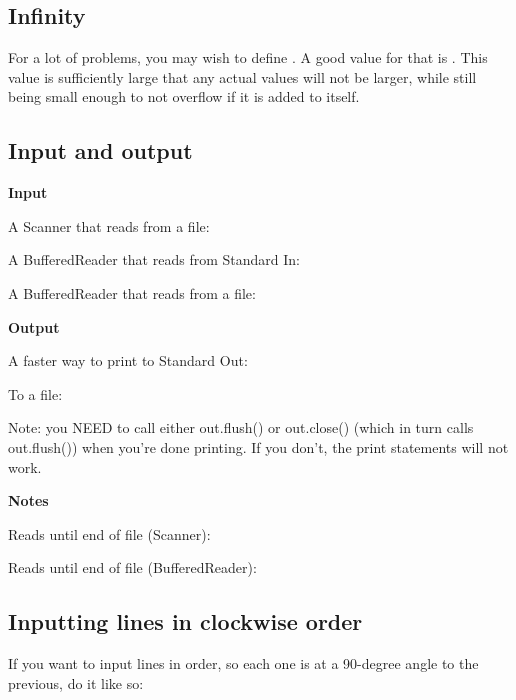 \subsection*{Infinity}

For a lot of problems, you may wish to define . A good value for that is . This value is sufficiently large that any actual values will not be larger, while still being small enough to not overflow if it is added to itself.

\subsection*{Input and output}

\textbf{Input}

A Scanner that reads from a file: 

A BufferedReader that reads from Standard In: 

A BufferedReader that reads from a file: 

\textbf{Output}

A faster way to print to Standard Out: 

To a file: 

Note: you NEED to call either out.flush() or out.close() (which in turn calls out.flush()) when you're done printing. If you don't, the print statements will not work.

\textbf{Notes}

Reads until end of file (Scanner): 

Reads until end of file (BufferedReader): 

\subsection*{Inputting lines in clockwise order}

If you want to input lines in order, so each one is at a 90-degree angle to the previous, do it like so:

